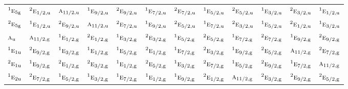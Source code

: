 \documentclass[10pt,a4paper]{article}
\numberwithin{equation}{section}
\newcommand{\irr}[1]{\text{\normalfont\scshape #1}}
\newcommand{\conjpair}[1]{{}^{#1}}
\newcommand{\ptag}[1]{\mathrm{#1}}
\begin{document}
{\begin{longtable}{@{}lccccccccccc@{}}
$\conjpair{1}\irr{e}_{5\ptag{g}}$ & $\conjpair{2}\irr{e}_{1/2,\ptag{u}}$ & $\irr{a}_{11/2,\ptag{u}}$ & $\conjpair{1}\irr{e}_{9/2,\ptag{u}}$ & $\conjpair{2}\irr{e}_{9/2,\ptag{u}}$ & $\conjpair{1}\irr{e}_{7/2,\ptag{u}}$ & $\conjpair{2}\irr{e}_{7/2,\ptag{u}}$ & $\conjpair{1}\irr{e}_{5/2,\ptag{u}}$ & $\conjpair{2}\irr{e}_{5/2,\ptag{u}}$ & $\conjpair{1}\irr{e}_{3/2,\ptag{u}}$ & $\conjpair{2}\irr{e}_{3/2,\ptag{u}}$ & $\conjpair{1}\irr{e}_{1/2,\ptag{u}}$\\
$\conjpair{2}\irr{e}_{5\ptag{g}}$ & $\conjpair{1}\irr{e}_{1/2,\ptag{u}}$ & $\conjpair{2}\irr{e}_{9/2,\ptag{u}}$ & $\irr{a}_{11/2,\ptag{u}}$ & $\conjpair{2}\irr{e}_{7/2,\ptag{u}}$ & $\conjpair{1}\irr{e}_{9/2,\ptag{u}}$ & $\conjpair{2}\irr{e}_{5/2,\ptag{u}}$ & $\conjpair{1}\irr{e}_{7/2,\ptag{u}}$ & $\conjpair{2}\irr{e}_{3/2,\ptag{u}}$ & $\conjpair{1}\irr{e}_{5/2,\ptag{u}}$ & $\conjpair{2}\irr{e}_{1/2,\ptag{u}}$ & $\conjpair{1}\irr{e}_{3/2,\ptag{u}}$\\
$\irr{a}_{\ptag{u}}$ & $\irr{a}_{11/2,\ptag{g}}$ & $\conjpair{1}\irr{e}_{1/2,\ptag{g}}$ & $\conjpair{2}\irr{e}_{1/2,\ptag{g}}$ & $\conjpair{1}\irr{e}_{3/2,\ptag{g}}$ & $\conjpair{2}\irr{e}_{3/2,\ptag{g}}$ & $\conjpair{1}\irr{e}_{5/2,\ptag{g}}$ & $\conjpair{2}\irr{e}_{5/2,\ptag{g}}$ & $\conjpair{1}\irr{e}_{7/2,\ptag{g}}$ & $\conjpair{2}\irr{e}_{7/2,\ptag{g}}$ & $\conjpair{1}\irr{e}_{9/2,\ptag{g}}$ & $\conjpair{2}\irr{e}_{9/2,\ptag{g}}$\\
$\conjpair{1}\irr{e}_{1\ptag{u}}$ & $\conjpair{2}\irr{e}_{9/2,\ptag{g}}$ & $\conjpair{1}\irr{e}_{3/2,\ptag{g}}$ & $\conjpair{1}\irr{e}_{1/2,\ptag{g}}$ & $\conjpair{1}\irr{e}_{5/2,\ptag{g}}$ & $\conjpair{2}\irr{e}_{1/2,\ptag{g}}$ & $\conjpair{1}\irr{e}_{7/2,\ptag{g}}$ & $\conjpair{2}\irr{e}_{3/2,\ptag{g}}$ & $\conjpair{1}\irr{e}_{9/2,\ptag{g}}$ & $\conjpair{2}\irr{e}_{5/2,\ptag{g}}$ & $\irr{a}_{11/2,\ptag{g}}$ & $\conjpair{2}\irr{e}_{7/2,\ptag{g}}$\\
$\conjpair{2}\irr{e}_{1\ptag{u}}$ & $\conjpair{1}\irr{e}_{9/2,\ptag{g}}$ & $\conjpair{2}\irr{e}_{1/2,\ptag{g}}$ & $\conjpair{2}\irr{e}_{3/2,\ptag{g}}$ & $\conjpair{1}\irr{e}_{1/2,\ptag{g}}$ & $\conjpair{2}\irr{e}_{5/2,\ptag{g}}$ & $\conjpair{1}\irr{e}_{3/2,\ptag{g}}$ & $\conjpair{2}\irr{e}_{7/2,\ptag{g}}$ & $\conjpair{1}\irr{e}_{5/2,\ptag{g}}$ & $\conjpair{2}\irr{e}_{9/2,\ptag{g}}$ & $\conjpair{1}\irr{e}_{7/2,\ptag{g}}$ & $\irr{a}_{11/2,\ptag{g}}$\\
$\conjpair{1}\irr{e}_{2\ptag{u}}$ & $\conjpair{2}\irr{e}_{7/2,\ptag{g}}$ & $\conjpair{1}\irr{e}_{5/2,\ptag{g}}$ & $\conjpair{1}\irr{e}_{3/2,\ptag{g}}$ & $\conjpair{1}\irr{e}_{7/2,\ptag{g}}$ & $\conjpair{1}\irr{e}_{1/2,\ptag{g}}$ & $\conjpair{1}\irr{e}_{9/2,\ptag{g}}$ & $\conjpair{2}\irr{e}_{1/2,\ptag{g}}$ & $\irr{a}_{11/2,\ptag{g}}$ & $\conjpair{2}\irr{e}_{3/2,\ptag{g}}$ & $\conjpair{2}\irr{e}_{9/2,\ptag{g}}$ & $\conjpair{2}\irr{e}_{5/2,\ptag{g}}$\\

\end{longtable}}
\end{document}
